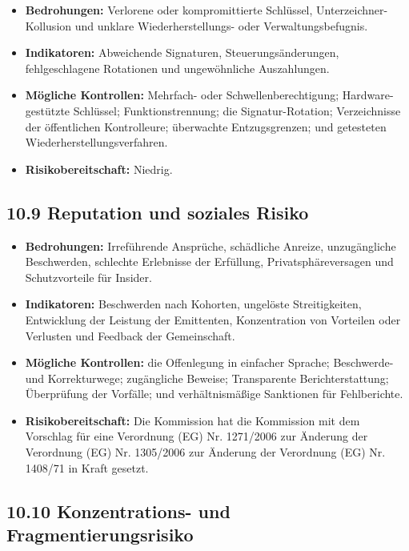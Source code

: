 \documentclass[11pt]{article}
\begin{document}
\begin{itemize}[leftmargin=*]
\item \textbf{Bedrohungen:} Verlorene oder kompromittierte Schlüssel, Unterzeichner-Kollusion und unklare Wiederherstellungs- oder Verwaltungsbefugnis.
\item \textbf{Indikatoren:} Abweichende Signaturen, Steuerungsänderungen, fehlgeschlagene Rotationen und ungewöhnliche Auszahlungen.
\item \textbf{Mögliche Kontrollen:} Mehrfach- oder Schwellenberechtigung; Hardware-gestützte Schlüssel; Funktionstrennung; die Signatur-Rotation; Verzeichnisse der öffentlichen Kontrolleure; überwachte Entzugsgrenzen; und getesteten Wiederherstellungsverfahren.
\item \textbf{Risikobereitschaft:} Niedrig.
\end{itemize}
\subsection*{10.9 Reputation und soziales Risiko}

\begin{itemize}[leftmargin=*]
\item \textbf{Bedrohungen:} Irreführende Ansprüche, schädliche Anreize, unzugängliche Beschwerden, schlechte Erlebnisse der Erfüllung, Privatsphäreversagen und Schutzvorteile für Insider.
\item \textbf{Indikatoren:} Beschwerden nach Kohorten, ungelöste Streitigkeiten, Entwicklung der Leistung der Emittenten, Konzentration von Vorteilen oder Verlusten und Feedback der Gemeinschaft.
\item \textbf{Mögliche Kontrollen:} die Offenlegung in einfacher Sprache; Beschwerde- und Korrekturwege; zugängliche Beweise; Transparente Berichterstattung; Überprüfung der Vorfälle; und verhältnismäßige Sanktionen für Fehlberichte.
\item \textbf{Risikobereitschaft:} Die Kommission hat die Kommission mit dem Vorschlag für eine Verordnung (EG) Nr. 1271/2006 zur Änderung der Verordnung (EG) Nr. 1305/2006 zur Änderung der Verordnung (EG) Nr. 1408/71 in Kraft gesetzt.
\end{itemize}
\subsection*{10.10 Konzentrations- und Fragmentierungsrisiko}
\end{document}
